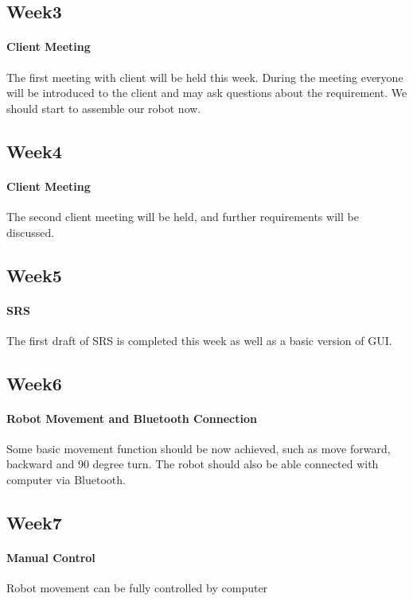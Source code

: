 \documentclass[11pt, a4paper]{report}
\begin{document}
\subsection{Week3}
\paragraph{Client Meeting}
 The first meeting with client will be held this week. During the meeting everyone will be introduced to the client and may ask questions about the requirement. We should start to assemble our robot now.
 
\subsection{Week4}
\paragraph{Client Meeting}
The second client meeting will be held, and further requirements will be discussed. 

\subsection{Week5}
\paragraph{SRS}
The first draft of SRS is completed this week as well as a basic version of GUI.


\subsection{Week6}
\paragraph{Robot Movement and Bluetooth Connection}
Some basic movement function should be now achieved, such as move forward, backward and 90 degree turn. The robot should also be able connected with computer via Bluetooth.

\subsection{Week7}
\paragraph{Manual Control}
Robot movement can be fully controlled by computer 
\end{document}
